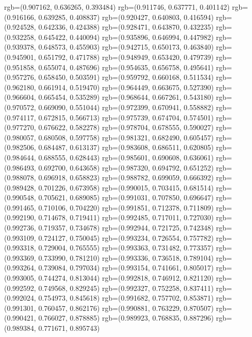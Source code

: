{{{					rgb=(0.907162, 0.636265, 0.393484)
					rgb=(0.911746, 0.637771, 0.401142)
					rgb=(0.916166, 0.639285, 0.408837)
					rgb=(0.920427, 0.640803, 0.416594)
					rgb=(0.924528, 0.642336, 0.424388)
					rgb=(0.928471, 0.643870, 0.432235)
					rgb=(0.932258, 0.645422, 0.440094)
					rgb=(0.935896, 0.646994, 0.447982)
					rgb=(0.939378, 0.648573, 0.455903)
					rgb=(0.942715, 0.650173, 0.463840)
					rgb=(0.945901, 0.651792, 0.471788)
					rgb=(0.948949, 0.653420, 0.479739)
					rgb=(0.951858, 0.655074, 0.487696)
					rgb=(0.954635, 0.656758, 0.495641)
					rgb=(0.957276, 0.658450, 0.503591)
					rgb=(0.959792, 0.660168, 0.511534)
					rgb=(0.962180, 0.661914, 0.519470)
					rgb=(0.964449, 0.663675, 0.527390)
					rgb=(0.966604, 0.665454, 0.535289)
					rgb=(0.968644, 0.667261, 0.543180)
					rgb=(0.970572, 0.669090, 0.551044)
					rgb=(0.972399, 0.670941, 0.558882)
					rgb=(0.974117, 0.672815, 0.566713)
					rgb=(0.975739, 0.674704, 0.574501)
					rgb=(0.977270, 0.676622, 0.582278)
					rgb=(0.978704, 0.678555, 0.590027)
					rgb=(0.980057, 0.680508, 0.597758)
					rgb=(0.981321, 0.682490, 0.605457)
					rgb=(0.982506, 0.684487, 0.613137)
					rgb=(0.983608, 0.686511, 0.620805)
					rgb=(0.984644, 0.688555, 0.628443)
					rgb=(0.985601, 0.690608, 0.636061)
					rgb=(0.986493, 0.692700, 0.643658)
					rgb=(0.987320, 0.694792, 0.651252)
					rgb=(0.988078, 0.696918, 0.658823)
					rgb=(0.988782, 0.699059, 0.666392)
					rgb=(0.989428, 0.701226, 0.673958)
					rgb=(0.990015, 0.703415, 0.681514)
					rgb=(0.990548, 0.705621, 0.689085)
					rgb=(0.991031, 0.707850, 0.696647)
					rgb=(0.991465, 0.710106, 0.704220)
					rgb=(0.991851, 0.712378, 0.711809)
					rgb=(0.992190, 0.714678, 0.719411)
					rgb=(0.992485, 0.717011, 0.727030)
					rgb=(0.992736, 0.719357, 0.734678)
					rgb=(0.992944, 0.721725, 0.742348)
					rgb=(0.993109, 0.724127, 0.750045)
					rgb=(0.993234, 0.726554, 0.757782)
					rgb=(0.993318, 0.729004, 0.765555)
					rgb=(0.993363, 0.731482, 0.773357)
					rgb=(0.993369, 0.733990, 0.781210)
					rgb=(0.993336, 0.736518, 0.789104)
					rgb=(0.993264, 0.739084, 0.797034)
					rgb=(0.993154, 0.741661, 0.805017)
					rgb=(0.993005, 0.744274, 0.813044)
					rgb=(0.992818, 0.746912, 0.821120)
					rgb=(0.992592, 0.749568, 0.829245)
					rgb=(0.992327, 0.752258, 0.837411)
					rgb=(0.992024, 0.754973, 0.845618)
					rgb=(0.991682, 0.757702, 0.853871)
					rgb=(0.991301, 0.760457, 0.862176)
					rgb=(0.990881, 0.763229, 0.870507)
					rgb=(0.990421, 0.766027, 0.878885)
					rgb=(0.989923, 0.768835, 0.887296)
					rgb=(0.989384, 0.771671, 0.895743)
}}}
